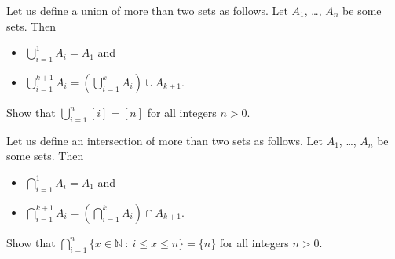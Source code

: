 \documentclass[addpoints]{exam}
\begin{document}
  \pagestyle{headandfoot}
  \runningheadrule

  \firstpagefooter{}{}{}
  \runningfooter{}{}{}
  \begin{flushright}

    \vspace{0.2in}
  \end{flushright}

  \begin{questions}
    \question[10]
      Let us define a union of more than two sets as follows.
			Let $A_1$, \dots, $A_n$ be some sets. Then
			\begin{itemize}
			  \item $\bigcup_{i = 1}^1 A_i = A_1$ and
			  \item $\bigcup_{i = 1}^{k + 1} A_i = \left( \bigcup_{i = 1}^k A_i \right)
			    \cup A_{k + 1}$.
			\end{itemize}
			
			Show that $\bigcup_{i = 1}^n [i] = [n]$ for all integers $n > 0$.

      \begin{solution}[\stretch{1}]
      \end{solution}
      \newpage
    \question[10]
      Let us define an intersection of more than two sets as follows.
			Let $A_1$, \dots, $A_n$ be some sets. Then
			\begin{itemize}
			  \item $\bigcap_{i = 1}^1 A_i = A_1$ and
			  \item $\bigcap_{i = 1}^{k + 1} A_i = \left( \bigcap_{i = 1}^k A_i \right)
			    \cap A_{k + 1}$.
			\end{itemize}
			
			Show that $\bigcap_{i = 1}^n \{x \in \mathbb{N} ~:~ i \le x \le n \} = \{n\}$
			for all integers $n > 0$.

      \begin{solution}[\stretch{1}]
      \end{solution}
      \newpage
  \end{questions}
\end{document}
